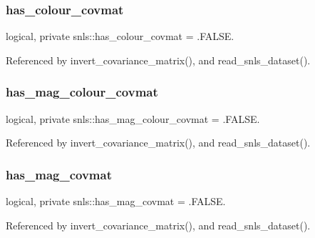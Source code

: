 \subsubsection{\texorpdfstring{has\+\_\+colour\+\_\+covmat}{has\_colour\_covmat}}
{\footnotesize\ttfamily logical, private snls\+::has\+\_\+colour\+\_\+covmat = .F\+A\+L\+S\+E.\hspace{0.3cm}{\ttfamily [private]}}



Referenced by invert\+\_\+covariance\+\_\+matrix(), and read\+\_\+snls\+\_\+dataset().

\mbox{\label{namespacesnls_a3557a6ed568984b4640e4128088cbf19}} 
\subsubsection{\texorpdfstring{has\+\_\+mag\+\_\+colour\+\_\+covmat}{has\_mag\_colour\_covmat}}
{\footnotesize\ttfamily logical, private snls\+::has\+\_\+mag\+\_\+colour\+\_\+covmat = .F\+A\+L\+S\+E.\hspace{0.3cm}{\ttfamily [private]}}



Referenced by invert\+\_\+covariance\+\_\+matrix(), and read\+\_\+snls\+\_\+dataset().

\mbox{\label{namespacesnls_aa8d535884df485fb5762eb12ad31da9a}} 
\subsubsection{\texorpdfstring{has\+\_\+mag\+\_\+covmat}{has\_mag\_covmat}}
{\footnotesize\ttfamily logical, private snls\+::has\+\_\+mag\+\_\+covmat = .F\+A\+L\+S\+E.\hspace{0.3cm}{\ttfamily [private]}}



Referenced by invert\+\_\+covariance\+\_\+matrix(), and read\+\_\+snls\+\_\+dataset().

\mbox{\label{namespacesnls_ae787ac7d0741e06d7699e05e691c1fac}} 
